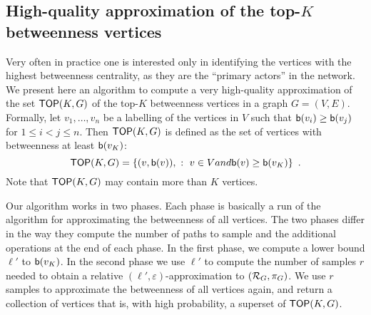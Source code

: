 \subsection{High-quality approximation of the top-$K$ betweenness
vertices}\label{sec:topk}

Very often in practice one is interested only in identifying the vertices with
the highest betweenness centrality, as they are the ``primary actors'' in the
network. We present here an algorithm to compute a very high-quality
approximation of the set $\mathsf{TOP}(K,G)$ of the top-$K$ betweenness vertices in a graph
$G=(V,E)$. Formally, let $v_1,\dotsc,v_n$ be a labelling of the vertices in $V$
such that $\mathsf{b}(v_i)\ge\mathsf{b}(v_j)$ for $1\le i<j\le n$. Then $\mathsf{TOP}(K,G)$ is
defined as the set of vertices with betweenness at least $\mathsf{b}(v_K)$:
\[
\mathsf{TOP}(K,G)=\{(v,\mathsf{b}(v)), ~:~ v\in V \relax{ and } \mathsf{b}(v)\ge\mathsf{b}(v_K)\}\enspace.
\]
Note that $\mathsf{TOP}(K,G)$ may contain more than $K$ vertices. 

Our algorithm works in two phases. Each phase is basically a run of the
algorithm for approximating the betweenness of all vertices. %
The two phases differ in the way they compute the number of paths to sample and
the additional operations at the end of each phase. In the first
phase, we compute a lower bound $\ell'$ to $\mathsf{b}(v_K)$. In the second phase we
use $\ell'$ to compute the number of samples $r$ needed to obtain a relative
$(\ell',\varepsilon)$-approximation to $(\mathcal{R}_G,\pi_G)$. We use $r$ samples to approximate the betweenness of all vertices again, and
return a collection of vertices that is, with high probability, a superset of
$\mathsf{TOP}(K,G)$.

